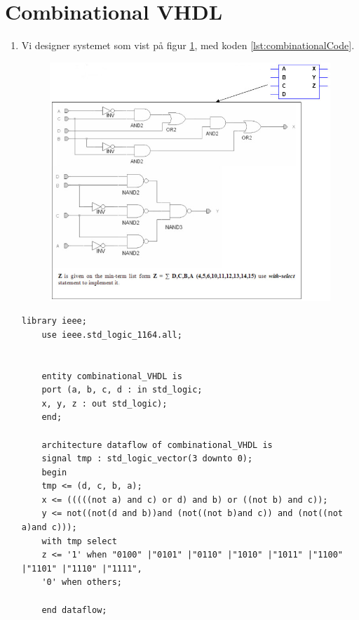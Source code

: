 \section{Combinational VHDL}
\begin{enumerate}
	\item[1)]
	Vi designer systemet som vist på figur \ref{fig:figur1}, med koden \ref{lst:combinationalCode}.
	\begin{figure}[h]
		\centering
		\includegraphics[scale=0.8]{pictures/Oevelse4/figur1.JPG}
		\caption{}
		\label{fig:figur1}
	\end{figure}
	\begin{lstlisting}[caption={Combinational VHDL kode},label={lst:combinationalCode}]
	library ieee;
	use ieee.std_logic_1164.all;
	
	
	entity combinational_VHDL is
	port (a, b, c, d : in std_logic;
	x, y, z : out std_logic);
	end;
	
	architecture dataflow of combinational_VHDL is
	signal tmp : std_logic_vector(3 downto 0);
	begin
	tmp <= (d, c, b, a);
	x <= (((((not a) and c) or d) and b) or ((not b) and c));
	y <= not((not(d and b))and (not((not b)and c)) and (not((not a)and c)));
	with tmp select
	z <= '1' when "0100" |"0101" |"0110" |"1010" |"1011" |"1100" |"1101" |"1110" |"1111",
	'0' when others; 
	
	end dataflow;
	\end{lstlisting}
	

\end{enumerate}
